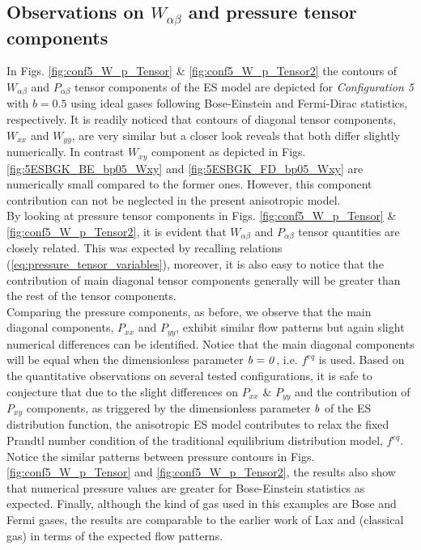 \documentclass{rsproca}%
\begin{document}
\subsection{Observations on \texorpdfstring{$W_{\alpha \beta}$}{Lg} and pressure tensor components}
In Figs. \ref{fig:conf5_W_p_Tensor} \& \ref{fig:conf5_W_p_Tensor2} the contours of $W_{\alpha \beta}$ and $P_{\alpha \beta}$ tensor components of the ES model are depicted for \emph{Configuration 5} with $b=0.5$ using ideal gases following Bose-Einstein and Fermi-Dirac statistics, respectively. It is readily noticed that contours of diagonal tensor components, $W_{xx}$ and $W_{yy}$, are very similar but a closer look reveals that both differ slightly numerically. In contrast $W_{xy}$ component as depicted in Figs. \ref{fig:5ESBGK_BE_bp05_Wxy} and \ref{fig:5ESBGK_FD_bp05_Wxy} are numerically small compared to the former ones. However, this component contribution can not be neglected in the present anisotropic model. \\
By looking at pressure tensor components in Figs. \ref{fig:conf5_W_p_Tensor} \& \ref{fig:conf5_W_p_Tensor2}, it is evident that $W_{\alpha \beta}$ and $P_{\alpha \beta}$ tensor quantities are closely related. This was expected by recalling relations (\ref{eq:pressure_tensor_variables}), moreover, it is also easy to notice that the contribution of main diagonal tensor components generally will be greater than the rest of the tensor components. \\
Comparing the pressure components, as before, we observe that the main diagonal components, $P_{xx}$ and $P_{yy}$, exhibit similar flow patterns but again slight numerical differences can be identified.  Notice that the main diagonal components will be equal when the dimensionless parameter $\it{b = 0}$, i.e. $f^{eq}$ is used.  Based on the quantitative observations on several tested configurations, it is safe to conjecture that due to the slight differences on $P_{xx}$ \& $P_{yy}$ and the contribution of $P_{xy}$ components, as triggered by the dimensionless parameter $\it{b}$ of the ES distribution function, the anisotropic ES model contributes to relax the fixed Prandtl number condition of the traditional equilibrium distribution model, $f^{eq}$. \\
Notice the similar patterns between pressure contours in Figs. \ref{fig:conf5_W_p_Tensor} and \ref{fig:conf5_W_p_Tensor2}, the results also show that numerical pressure values are greater for Bose-Einstein statistics as expected.  Finally, although the kind of gas used in this examples are Bose and Fermi gases, the results are comparable to the earlier work of Lax \cite{Laxliu95} and \cite{schultzrinne} (classical gas) in terms of the expected flow patterns.
\end{document}
